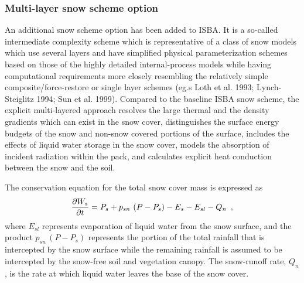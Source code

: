 \subsubsection{Multi-layer snow scheme option}

An additional snow scheme option has been added to ISBA.
It is a so-called intermediate complexity scheme which
is representative of a class of snow models which
use several layers and have simplified physical parameterization schemes
based on those of the highly detailed internal-process models
while having computational requirements more closely resembling
the relatively simple
composite/force-restore or single layer schemes
(eg.s Loth et al. 1993; Lynch-Steiglitz 1994; Sun et al. 1999).
%
Compared to the baseline ISBA snow scheme,
the explicit multi-layered approach
resolves the large thermal and the density gradients
which can exist in the snow cover, distinguishes the surface
energy budgets of the snow and non-snow covered portions
of the surface, includes the effects of liquid water storage
in the snow cover, models the
absorption of incident radiation within the pack,
and calculates explicit heat conduction between the
snow and the soil.

The conservation equation for the total snow cover mass
is expressed as
%
\begin{eqnarray}
{\partial W_s \over \partial t} =
P_s + p_{sn}\,\left(P-P_s\right) - E_{s} - E_{sl} - Q_n
\,\,\,,
\end{eqnarray}
%
where $E_{sl}$ represents evaporation of liquid water
from the snow surface, and the product $p_{sn}\,\left(P-P_s\right)$
represents the portion of the total rainfall that is
intercepted by the snow surface while the remaining
rainfall is assumed to be intercepted by the snow-free soil and vegetation
canopy. The snow-runoff rate, $Q_n$,
is the rate at which
liquid water leaves the base of the snow cover.

